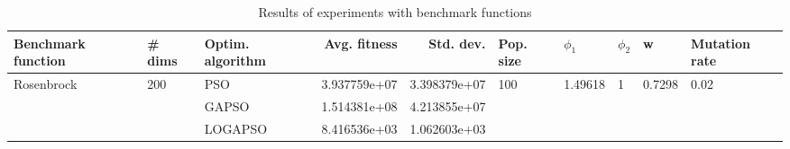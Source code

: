 \begin{table}
\centering
\caption{Results of experiments with benchmark functions}
\begin{tabular}{lllrrlllll}
\toprule
         Benchmark function &              \# dims & Optim. algorithm &  Avg. fitness &    Std. dev. &            Pop. size &               $\phi_{1}$ &         $\phi_{2}$ &                       w &         Mutation rate \\
\midrule
\multirow{3}{*}{Rosenbrock} & \multirow{3}{*}{200} &              PSO &  3.937759e+07 & 3.398379e+07 & \multirow{3}{*}{100} & \multirow{3}{*}{1.49618} & \multirow{3}{*}{1} & \multirow{3}{*}{0.7298} & \multirow{3}{*}{0.02} \\
                            &                      &            GAPSO &  1.514381e+08 & 4.213855e+07 &                      &                          &                    &                         &                       \\
                            &                      &          LOGAPSO &  8.416536e+03 & 1.062603e+03 &                      &                          &                    &                         &                       \\
\bottomrule
\end{tabular}
\end{table}
